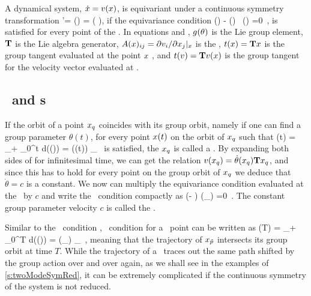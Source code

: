 \documentclass[aip,cha,
reprint,
secnumarabic,
nofootinbib, tightenlines,
nobibnotes, showkeys, showpacs,
groupedaddress,
]{revtex4-1}
\begin{document}
A dynamical system, $\dot{x}=v(x)$, is equivariant under a continuous
symmetry transformation
\beq
	\ssp'= \LieEl (\theta) \ssp = \exp\left( \theta \Lg\right)\ssp,
if the equivariance condition 
\beq
  \groupTan(\vel)  - \Mvar(\ssp) \, \groupTan(\ssp) =0
  \,,
is satisfied for every point of the \statesp . In equations  and ,
$g (\theta)$ is the Lie group element, $\mathbf{T}$ is the Lie algebra generator,
$A(x)_{ij} = {\partial v_i}/{\partial x_j} |_x$  is the \stabmat ,
$ t(x) = \mathbf{T} x $ is the group tangent evaluated at the point $x$ ,
and $ t(v) = \mathbf{T} v(x) $ is the group tangent for the velocity
vector evaluated at \ssp .

\subsection{\Reqva\ and \rpo s}
\label{s:relatives}

If the orbit of a point $x_q$ coincides with its group orbit,
namely if one can find a group parameter $\theta (t)$, for every point $x (t)$
on the orbit of $x_q$ such that
\beq
  \ssp (t) = \ssp_\stagn + \int_0^t d\tau \vel(\ssp (\tau)) = \LieEl (\theta (t)) \ssp_\stagn
  \,
is satisfied, the $x_q$ is called a \reqv . By expanding both sides of 
for infinitesimal time, we can get the relation $v(x_q) = \dot{\theta}(x_q) \mathbf{T} x_q$,
and since this has to hold for every point on the group orbit of $x_q$
we deduce that $\dot{\theta} = c$ is a constant. We now can multiply the equivariance
condition  evaluated at the \reqv\ by $c$ and write the
\reqv\ condition compactly as
\beq
(\velRel \Lg - \Mvar ) \vel (\ssp_\stagn) =0
\,.
The constant group parameter velocity $c$  is called the \phaseVel .

Similar to the \reqv\ condition , \rpo\ condition for a \statesp\ point can be written as
\beq
  \ssp (T) = \ssp_\rpprime  + \int_0^T d\tau \vel(\ssp (\tau)) = \LieEl (\theta_\rpprime ) \ssp_\rpprime
  \,,
meaning that the trajectory of $x_{\tilde{p}}$ intersects its group orbit at
time $T$. While the trajectory of a \rpo\ traces out the same path shifted
by the group action over and over again, as we shall see in the examples of
\ref{s:twoModeSymRed}, it can be extremely complicated if the continuous
symmetry of the system is not reduced.
\end{document}
